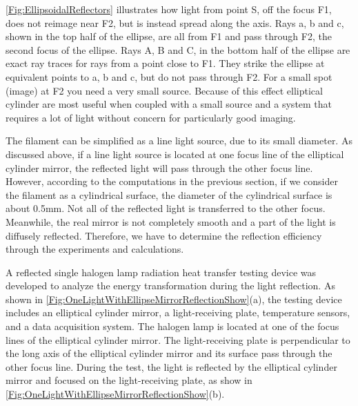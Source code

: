 \ref{Fig:EllipsoidalReflectors} illustrates how light from point S, off the focus F1, does not reimage near F2, but is instead spread along the axis.
Rays a, b and c, shown in the top half of the ellipse, are all from F1 and pass through F2, the second focus of the ellipse. Rays A, B and C, in the bottom half of the ellipse are exact ray traces for rays from a point close to F1. They strike the ellipse at equivalent points to a, b and c, but do not pass through F2. For a small spot (image) at F2 you need a very small source.
Because of this effect elliptical cylinder are most useful when coupled with a small source and a system that requires a lot of light without concern for particularly good imaging.



The filament can be simplified as a line light source, due to its small diameter. As discussed above, if a line light source is located at one focus line of the elliptical cylinder mirror, the reflected light will pass through the other focus line.
However, according to the computations in the previous section, if we consider the filament as a cylindrical surface, the diameter of the cylindrical surface is about 0.5mm. Not all of the reflected light is transferred to the other focus.
Meanwhile, the real mirror is not completely smooth and a part of the light is diffusely reflected. Therefore, we have to determine the reflection efficiency through the experiments and calculations.

A reflected single halogen lamp radiation heat transfer testing device was developed to analyze the energy transformation during the light reflection.
As shown in \ref{Fig:OneLightWithEllipseMirrorReflectionShow}(a), the testing
device includes an elliptical cylinder mirror, a light-receiving plate, temperature sensors, and a data acquisition system.
The halogen lamp is located at one of the focus lines of the elliptical cylinder mirror. The light-receiving plate is perpendicular to the long axis of the elliptical cylinder mirror and its surface pass through the other focus line. During the test, the light is reflected by the elliptical cylinder mirror and focused on the light-receiving plate, as show in \ref{Fig:OneLightWithEllipseMirrorReflectionShow}(b).

